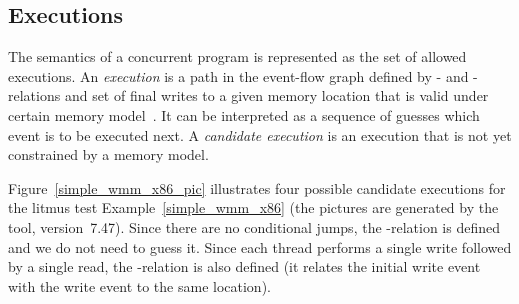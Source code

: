 \subsection{Executions}
\label{ch:wmm:model:executions}

The semantics of a concurrent program is represented as the set of allowed executions.
An \textit{execution} is a path in the event-flow graph defined by \po- and \rf-relations and set of final writes to a given memory location that is valid under certain memory model~\cite{alglave2014herding}.
It can be interpreted as a sequence of guesses which event is to be executed next.
A \textit{candidate execution} is an execution that is not yet constrained by a memory model.

Figure~\ref{simple_wmm_x86_pic} illustrates four possible candidate executions for the litmus test Example~\ref{simple_wmm_x86} (the pictures are generated by the  tool, version~7.47).
Since there are no conditional jumps, the \po-relation is defined and we do not need to guess it.
Since each thread performs a single write followed by a single read, the \co-relation is also defined (it relates the initial write event with the write event to the same location).

